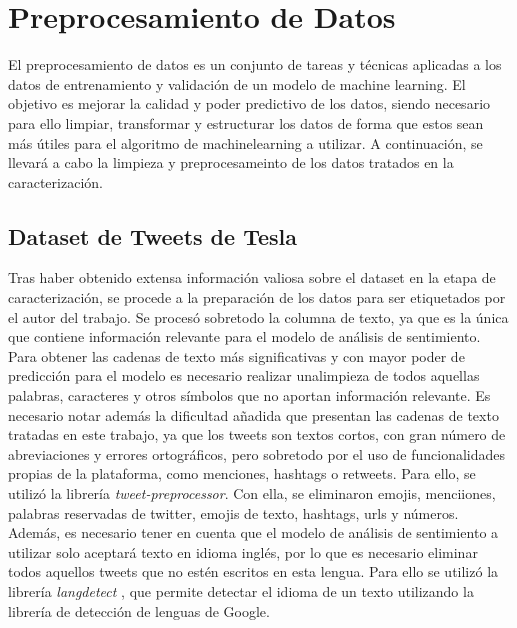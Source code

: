 \documentclass[a4paper, 12pt]{report}
\begin{document}
    \chapter{Preprocesamiento de Datos}

                El preprocesamiento de datos es un conjunto de tareas y técnicas aplicadas a los datos de entrenamiento y validación de un modelo de machine learning. El objetivo es 
                mejorar la calidad y poder predictivo de los datos, siendo necesario para ello limpiar, transformar y estructurar los datos de forma que estos sean más útiles para el algoritmo de machinelearning a utilizar.
                A continuación, se llevará a cabo la limpieza y preprocesameinto de los datos tratados en la caracterización.

                \section{Dataset de Tweets de Tesla}

                        Tras haber obtenido extensa información valiosa sobre el dataset en la etapa de caracterización, 
                        se procede a la preparación de los datos para ser etiquetados por el autor del trabajo. Se procesó
                        sobretodo la columna de texto, ya que es la única que contiene información relevante para el modelo de análisis de sentimiento.\\

                        Para obtener las cadenas de texto más significativas y con mayor poder de predicción para el modelo es necesario 
                        realizar unalimpieza de todos aquellas palabras, caracteres y otros símbolos que no aportan información relevante.
                        Es necesario notar además la dificultad añadida que presentan las cadenas de texto tratadas en este trabajo, ya que
                        los tweets son textos cortos, con gran número de abreviaciones y errores ortográficos, pero sobretodo por el uso de 
                        funcionalidades propias de la plataforma, como menciones, hashtags o retweets. Para ello, se utilizó la librería \textit{tweet-preprocessor}\cite{tweet-preprocessor}. Con ella, se eliminaron emojis, menciiones, palabras reservadas de twitter, emojis de texto, hashtags, urls y números.\\

                        Además, es necesario tener en cuenta que el modelo de análisis de sentimiento a utilizar solo aceptará texto en idioma inglés,
                        por lo que es necesario eliminar todos aquellos tweets que no estén escritos en esta lengua. Para ello se utilizó la
                        librería \textit{langdetect} \cite{langdetect}, que permite detectar el idioma de un texto utilizando la librería de detección de lenguas de Google.\\
\end{document}
